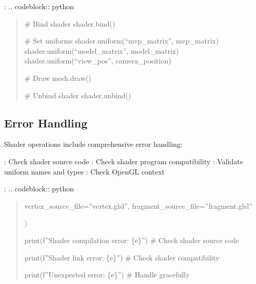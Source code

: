 \documentclass[a4paper,10pt,english,openany,oneside]{sphinxmanual}
\begin{document}
\sphinxAtStartPar
{}:
.. code\sphinxhyphen{}block:: python
\begin{quote}

\sphinxAtStartPar
\# Bind shader
shader.bind()

\sphinxAtStartPar
\# Set uniforms
shader.uniform(“mvp\_matrix”, mvp\_matrix)
shader.uniform(“model\_matrix”, model\_matrix)
shader.uniform(“view\_pos”, camera\_position)

\sphinxAtStartPar
\# Draw
mesh.draw()

\sphinxAtStartPar
\# Unbind shader
shader.unbind()
\end{quote}


\subsection{Error Handling}
\label{\detokenize{api/shaders:error-handling}}
\sphinxAtStartPar
Shader operations include comprehensive error handling:

\sphinxAtStartPar
{}: Check shader source code
: Check shader program compatibility
: Validate uniform names and types
: Check OpenGL context

\sphinxAtStartPar
{}:
.. code\sphinxhyphen{}block:: python
\begin{quote}
\begin{description}
\begin{description}
\sphinxAtStartPar
vertex\_source\_file=”vertex.glsl”,
fragment\_source\_file=”fragment.glsl”

\end{description}

\sphinxAtStartPar
)

\sphinxAtStartPar
print(f”Shader compilation error: \{e\}”)
\# Check shader source code

\sphinxAtStartPar
print(f”Shader link error: \{e\}”)
\# Check shader compatibility

\sphinxAtStartPar
print(f”Unexpected error: \{e\}”)
\# Handle gracefully

\end{description}
\end{quote}
\end{document}
